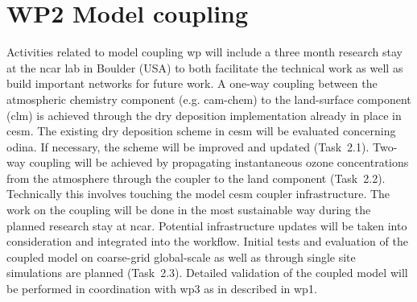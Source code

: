 \section{WP2 Model coupling}
\label{sec:wp2}
Activities related to model coupling \gls{wp} will include a three month research stay at the \gls{ncar} lab in Boulder (USA) to both facilitate the technical work as well as build important networks for future work. A one-way coupling between the atmospheric chemistry component (e.g. \gls{cam}-chem) to the land-surface component (\gls{clm}) is achieved through the dry deposition implementation already in place in \gls{cesm}. The existing dry deposition scheme in \gls{cesm} will be evaluated concerning \gls{odina}. If necessary, the scheme will be improved and updated (Task~2.1). Two-way coupling will be achieved by propagating instantaneous ozone concentrations from the atmosphere through the coupler to the land component (Task~2.2). Technically this involves touching the model \gls{cesm} coupler infrastructure. The work on the coupling will be done in the most sustainable way during the planned research stay at \gls{ncar}. Potential infrastructure updates will be taken into consideration and integrated into the workflow. Initial tests and evaluation of the coupled model on coarse-grid global-scale as well as through  single site simulations are planned (Task~2.3). Detailed validation of the coupled model will be performed in coordination with \gls{wp}3 as in described in \gls{wp}1.

